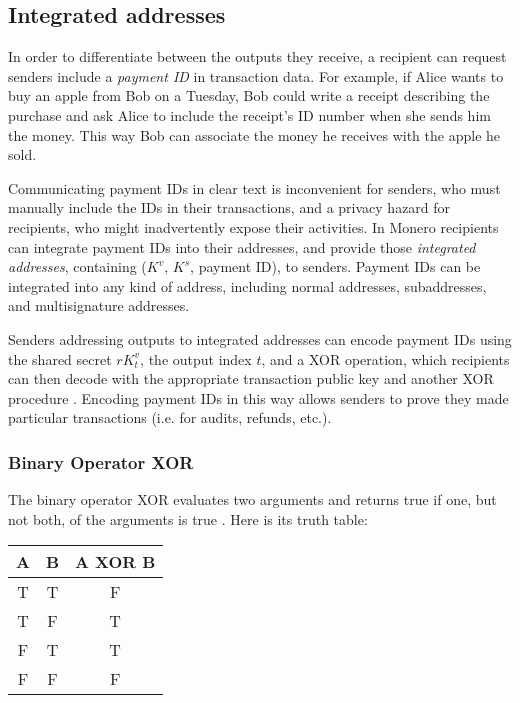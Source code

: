 \subsection{Integrated addresses}
\label{sec:integrated-addresses}

In order to differentiate between the outputs they receive, a recipient can request senders include a {\em payment ID} in transaction data. For example, if Alice wants to buy an apple from Bob on a Tuesday, Bob could write a receipt describing the purchase and ask Alice to include the receipt's ID number when she sends him the money. This way Bob can associate the money he receives with the apple he sold.

Communicating payment IDs in clear text is inconvenient for senders, who must manually include the IDs in their transactions, and a privacy hazard for recipients, who might inadvertently expose their activities. In Monero recipients can integrate payment IDs into their addresses, and provide those {\em integrated addresses}, containing ($K^v$, $K^s$, payment ID), to senders. Payment IDs can be integrated into any kind of address, including normal addresses, subaddresses, and multisignature addresses.

Senders addressing outputs to integrated addresses can encode payment IDs using the shared secret $r K_t^v$, the output index $t$, and a XOR operation, which recipients can then decode with the appropriate transaction public key and another XOR procedure \cite{integrated-addresses}. Encoding payment IDs in this way allows senders to prove they made particular transactions (i.e. for audits, refunds, etc.).
    
\subsubsection*{Binary Operator XOR}

The binary operator XOR evaluates two arguments and returns true if one, but not both, of the arguments is true \cite{wolfram-xor}. Here is its truth table:

\begin{center}
    \begin{tabular}{|c|c|c|}
    \hline
        A & B & A XOR B \\
    \hline\hline
        T & T & F \\
    \hline
        T & F & T \\
    \hline
        F & T & T \\
    \hline
        F & F & F \\
    \hline
    \end{tabular}
\end{center}

